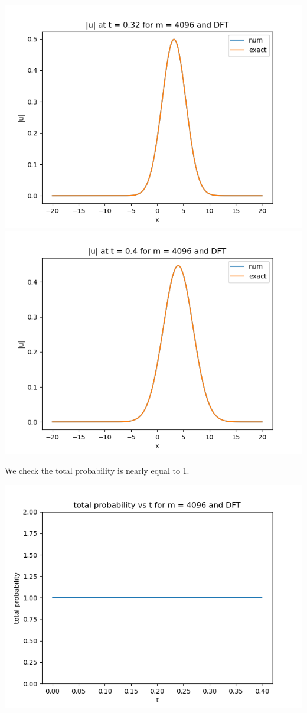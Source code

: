 \documentclass{article}
\begin{document}
\begin{enumerate}[label=(\alph*)]
\begin{center}
	\includegraphics[scale=.3]{FINAL u_abs t = 0.32 m = 4096 DFT}
	\includegraphics[scale=.3]{FINAL u_abs t = 0.4 m = 4096 DFT}
\end{center}
We check the total probability is nearly equal to 1.
\begin{center}
	\includegraphics[scale=.5]{FINAL prob m = 4096 DFT}
\end{center}



\end{enumerate}
\end{document}
